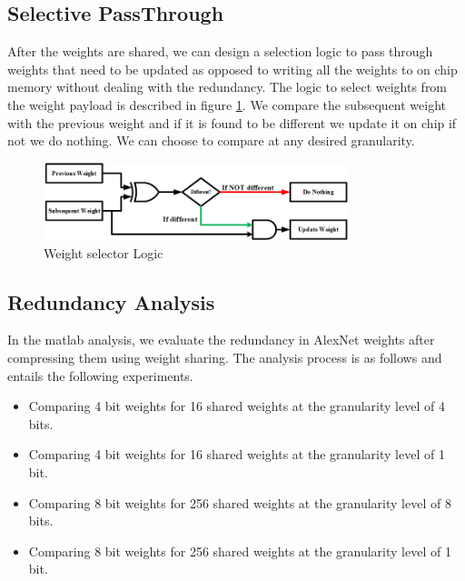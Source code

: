 \documentclass[conference]{IEEEtran}
\begin{document}
\subsection{Selective PassThrough}
After the weights are shared, we can design a selection logic to pass through weights that need to be updated as opposed to writing all the weights to on chip memory without dealing with the redundancy. The logic to select weights from the weight payload is described in figure \ref{sel}. We compare the subsequent weight with the previous weight and if it is found to be different we update it on chip if not we do nothing. We can choose to compare at any desired granularity.

\begin{figure}[!ht]
\centering
\includegraphics[width=3.5in]{selector}
\caption{Weight selector Logic}
\label{sel}
\end{figure}


\subsection{Redundancy Analysis}
In the matlab analysis, we evaluate the redundancy in AlexNet weights after compressing them using weight sharing. 
The analysis process is as follows and entails the following experiments.
\begin{itemize}
\item Comparing 4 bit weights for 16 shared weights at the granularity level of 4 bits. 

\item Comparing 4 bit weights for 16 shared weights at the granularity level of 1 bit. 

\item Comparing 8 bit weights for 256 shared weights at the granularity level of 8 bits. 

\item Comparing 8 bit weights for 256 shared weights at the granularity level of 1 bit. 
\end{itemize}
\end{document}
